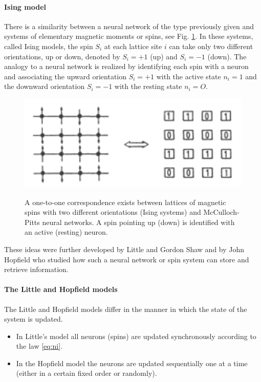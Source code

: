 \paragraph{Ising model}
There is a similarity between a neural network of the type previously given and systems of elementary magnetic moments or spins, see
Fig. \ref{fig:Spinising}. 
In these systems, called Ising models, the spin $S_i$ at each lattice site $i$ can take only two different orientations, up or down, denoted by $S_i = +1$ (up) and $S_i = -1$ (down). The analogy to a neural network is realized by identifying each spin with a neuron and associating the upward orientation $S_i = + 1$ with the active state $n_i = 1$ and the downward orientation $S_i = -1$ with the resting state $n_i = O$.

 \begin{figure}[h!t]
\centering
{\includegraphics[width=.50\textwidth]{Immagini/SpinIsing.pdf}}
\caption {A one-to-one correspondence exists between lattices of magnetic spins with two different orientations (Ising systems) and McCulloch-Pitts neural networks. A spin pointing up (down) is identified with an active (resting) neuron.}
\label{fig:Spinising}
\end{figure}

These ideas were further developed by Little and Gordon Shaw
and by John Hopfield who studied how such a neural network or spin
system can store and retrieve information.

\paragraph{The Little and Hopfield models}
 The Little and Hopfield models differ in the manner in which the state of the system is updated. 
 \begin{itemize}
     \item  In Little's model all neurons (spins) are updated synchronously according to the law \ref{eq:ni}.
     \item  In the Hopfield model the neurons are updated sequentially one at a time (either in a certain fixed order or randomly). 
 \end{itemize}


